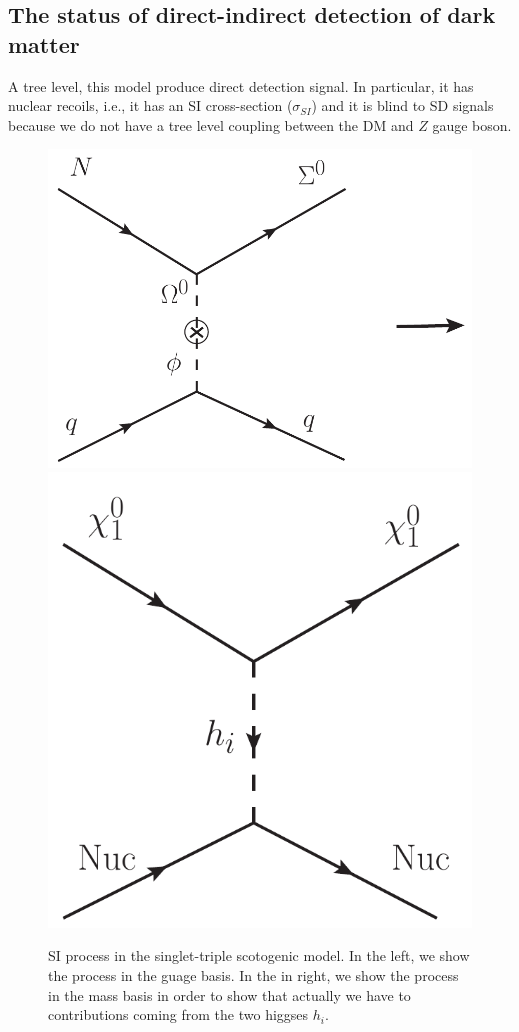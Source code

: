 \documentclass[12pt,letterpaper]{article}
\begin{document}
\subsection{The status of direct-indirect detection of dark matter }
\label{sec:indirect-direct-detection}
A tree level, this model produce direct detection signal. In particular, it has nuclear recoils, i.e., it has an SI cross-section ($\sigma_{SI}$) and it is blind to SD signals because we do not have a tree level coupling between the DM and $Z$ gauge boson. 
%
\begin{figure}
\begin{center}
\includegraphics[scale=0.37]{SI}
\includegraphics[scale=0.37]{SI-mass-basis}
\caption{SI process in the singlet-triple scotogenic model. In the left, we show the process in the guage basis. In the in right, we show the process in the mass basis in order to show that actually we have to contributions coming from the two higgses $h_i$.}
\label{fig:SI-diagram}
\end{center}
\end{figure}
\end{document}
